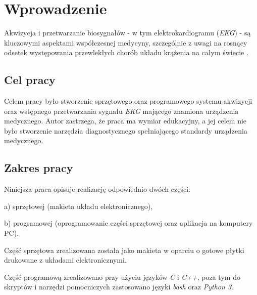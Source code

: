 
\chapter*{Wprowadzenie}

Akwizycja i przetwarzanie biosygnałów - w tym elektrokardiogramu (\textit{EKG}) - są kluczowymi aspektami 
współczesnej medycyny, szczególnie z uwagi na rosnący odsetek występowania przewlekłych chorób układu krążenia
na całym świecie \cite{Serhani2020}.  
 

\section*{Cel pracy}

Celem pracy było stworzenie sprzętowego oraz programowego systemu akwizycji oraz wstępnego przetwarzania sygnału \textit{EKG} mającego znamiona urządzenia medycznego.
Autor zastrzega, że praca ma wymiar edukacyjny, a jej celem nie było stworzenie narzędzia diagnostycznego spełniającego standardy urządzenia medycznego. 

\section*{Zakres pracy}

Niniejsza praca opisuje realizację odpowiednio dwóch części:

a) sprzętowej (makieta układu elektronicznego),

b) programowej (oprogramowanie części sprzętowej oraz aplikacja na komputery PC).


Część sprzętowa zrealizowana została jako makieta w oparciu o gotowe płytki drukowane z układami elektronicznymi.


Część programową zrealizowano przy użyciu języków \textit{C} i \textit{C++}, 
poza tym do skryptów i narzędzi pomocniczych zastosowano języki \textit{bash} oraz \textit{Python 3}.
